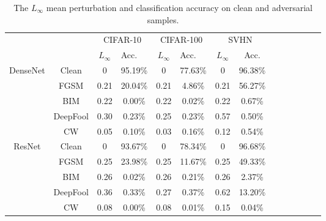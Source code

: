 \documentclass{article}
\begin{document}
\begin{table}[t]
\centering
\begin{tabular}{cc|cccccccccccc}
\toprule
 & & \multicolumn{2}{c|}{CIFAR-10} & \multicolumn{2}{c|}{CIFAR-100} & \multicolumn{2}{c}{SVHN}\\
&     & $L_{\infty}$ & \multicolumn{1}{l|}{Acc.} & $L_{\infty}$ & \multicolumn{1}{l|}{Acc.} & $L_{\infty}$     & Acc.    \\ \midrule
\multirow{5}{*}{DenseNet} &Clean   
& 0 & \multicolumn{1}{c|}{95.19\%}  
& 0 & \multicolumn{1}{c|}{77.63\%}  
& 0 & 96.38\%      
\\ 
&FGSM
& 0.21  & \multicolumn{1}{c|}{20.04\%}  
& 0.21 & \multicolumn{1}{c|}{4.86\%}  
& 0.21 & 56.27\%   
\\
&BIM
& 0.22 & \multicolumn{1}{c|}{0.00\%}  
& 0.22 & \multicolumn{1}{c|}{0.02\%}  
& 0.22 & 0.67\%      
\\
&DeepFool 
& 0.30 & \multicolumn{1}{c|}{0.23\%}  
& 0.25 & \multicolumn{1}{c|}{0.23\%}  
& 0.57 & 0.50\%       
\\
&CW 
& 0.05 & \multicolumn{1}{c|}{0.10\%}  
& 0.03 & \multicolumn{1}{c|}{0.16\%}  
& 0.12 &  0.54\%
\\\midrule
\multirow{5}{*}{ResNet} &Clean   
& 0  & \multicolumn{1}{c|}{93.67\%}  
& 0  & \multicolumn{1}{c|}{78.34\%}  
& 0  & 96.68\%
\\ 
&FGSM
& 0.25  & \multicolumn{1}{c|}{23.98\%}  
& 0.25 & \multicolumn{1}{c|}{11.67\%}  
& 0.25 & 49.33\%
\\
&BIM
& 0.26 & \multicolumn{1}{c|}{0.02\%}  
& 0.26  & \multicolumn{1}{c|}{0.21\%}  
& 0.26 & 2.37\%  
\\
&DeepFool 
& 0.36 & \multicolumn{1}{c|}{0.33\%}  
& 0.27 & \multicolumn{1}{c|}{0.37\%}  
& 0.62 &  13.20\%     
\\
&CW 
& 0.08  & \multicolumn{1}{c|}{0.00\%}  
& 0.08 & \multicolumn{1}{c|}{0.01\%}  
& 0.15 & 0.04\% 
\\\bottomrule
\end{tabular}
\vspace{0.1in}
\caption{The $L_{\infty}$ mean perturbation and classification accuracy on clean and adversarial samples.}
\label{tbl:adv_static}
\end{table}
\end{document}
